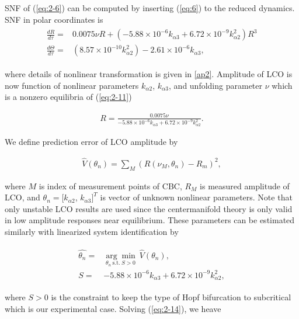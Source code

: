 \documentclass[openacc]{rsproca_new}%
\newcommand{\Eref}[1]{(\ref{#1})}
\begin{document}
SNF of \Eref{eq:2-6} can be computed by inserting \Eref{eq:6} to the reduced dynamics. SNF in polar coordinates is
\begin{align}\label{eq:2-11}
\begin{split}
\frac{dR}{d\tau}=&0.0075\nu R+(- 5.88 \times 10^{-6}  k_{\alpha 3} + 6.72 \times 10^{-9} k_{\alpha 2}^2)R^3\\
\frac{d\Theta}{d\tau}=&(8.57 \times 10^{-10}  k_{\alpha 2}^2) - 2.61 \times 10^{-6}k_{\alpha 3},
\end{split}
\end{align}

\noindent where details of nonlinear transformation is given in \ref{ap2}. Amplitude of LCO is now function of nonlinear parameters $k_{\alpha2}$, $k_{\alpha3}$, and unfolding parameter $\nu$ which is a nonzero equilibria of \Eref{eq:2-11}

\begin{align}\label{eq:2-12}
R=\frac{0.0075\nu}{- 5.88 \times 10^{-6}  k_{\alpha 3} + 6.72 \times 10^{-9} k_{\alpha 2}^2}.
\end{align}

\noindent We define prediction error of LCO amplitude by

\begin{align}\label{eq:2-13}
\hat{V}(\theta_n)=\sum_M (R(\nu_M,\theta_n)-R_m)^2,
\end{align}

\noindent where $M$ is index of measurement points of CBC, $R_M$ is measured amplitude of LCO, and $\theta_n=[k_{\alpha2}$, $k_{\alpha3}]^T$ is vector of unknown nonlinear parameters. Note that only unstable LCO results are used since the centermanifold theory is only valid in low amplitude responses near equilibrium. These parameters can be estimated similarly with linearized system identification by

\begin{align}\label{eq:2-14}
\begin{split}
\hat{\theta_n}=&\underset{\theta_n \: \textrm{s.t.} \: S>0} {\arg\min} \: \hat V(\theta_n),\\
S=&- 5.88 \times 10^{-6}  k_{\alpha 3} + 6.72 \times 10^{-9} k_{\alpha 2}^2,
\end{split}
\end{align}

\noindent where $S>0$ is the constraint to keep the type of Hopf bifurcation to subcritical which is our experimental case. Solving \Eref{eq:2-14}, we heave
\end{document}

